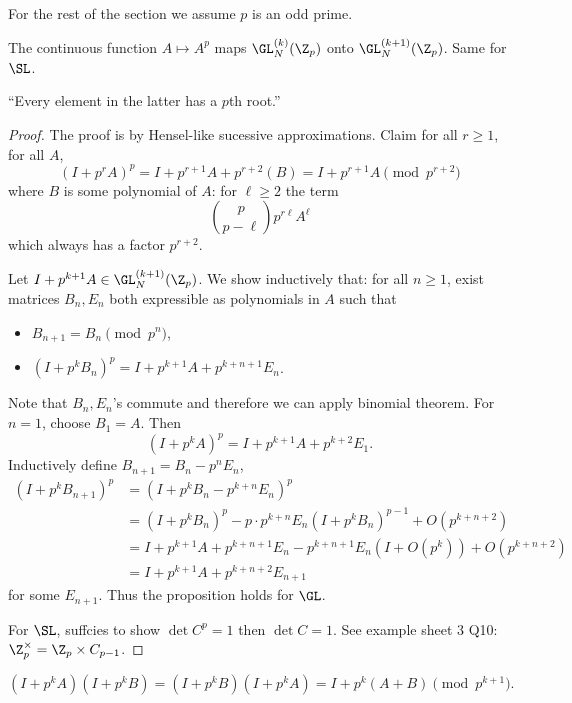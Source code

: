 \documentclass[a4paper]{article}
\begin{document}
For the rest of the section we assume \(p\) is an odd prime.

\begin{proposition}
  The continuous function \(A \mapsto A^p\) maps \(\GL_N^{(k)}(\Z_p)\) onto \(\GL_N^{(k + 1)}(\Z_p)\). Same for \(\SL\).
\end{proposition}

``Every element in the latter has a \(p\)th root.''

\begin{proof}
  The proof is by Hensel-like sucessive approximations. Claim for all \(r \geq 1\), for all \(A\),
  \[
    (I + p^rA)^p
    = I + p^{r + 1}A + p^{r + 2}(B)
    = I + p^{r + 1}A \pmod{p^{r + 2}}
  \]
  where \(B\) is some polynomial of \(A\): for \(\ell \geq 2\) the term
  \[
    \binom{p}{p - \ell} p^{r\ell} A^{\ell}
  \]
  which always has a factor \(p^{r + 2}\).

  Let \(I + p^{k + 1}A \in \GL_N^{(k + 1)}(\Z_p)\). We show inductively that: for all \(n \geq 1\), exist matrices \(B_n, E_n\) both expressible as polynomials in \(A\) such that
  \begin{itemize}
  \item \(B_{n + 1} = B_n \pmod{p^n}\),
  \item \((I + p^k B_n)^p = I + p^{k + 1}A + p^{k + n + 1}E_n\).
  \end{itemize}
  Note that \(B_n, E_n\)'s commute and therefore we can apply binomial theorem. For \(n = 1\), choose \(B_1 = A\). Then
  \[
    (I + p^kA)^p = I + p^{k + 1}A + p^{k + 2}E_1.
  \]
  Inductively define \(B_{n + 1} = B_n - p^n E_n\),
  \begin{align*}
    (I + p^k B_{n + 1})^p
    &= (I + p^k B_n - p^{k + n}E_n)^p \\
    &= (I + p^kB_n)^p - p \cdot p^{k + n} E_n (I + p^k B_n)^{p - 1} + O(p^{k + n + 2}) \\
    &= I + p^{k + 1}A + p^{k + n + 1}E_n - p^{k + n + 1} E_n (I + O(p^k)) + O(p^{k + n + 2}) \\
    &= I + p^{k + 1}A + p^{k + n + 2}E_{n + 1}
  \end{align*}
  for some \(E_{n + 1}\). Thus the proposition holds for \(\GL\).

  For \(\SL\), suffcies to show \(\det C^p = 1\) then \(\det C = 1\). See example sheet 3 Q10: \(\Z_p^\times = \Z_p \times C_{p - 1}\).
\end{proof}

\begin{lemma}
  \[
    (I + p^kA)(I + p^kB) = (I + p^k B)(I + p^kA) = I + p^k(A + B) \pmod{p^{k + 1}}.
  \]
\end{lemma}
\end{document}
